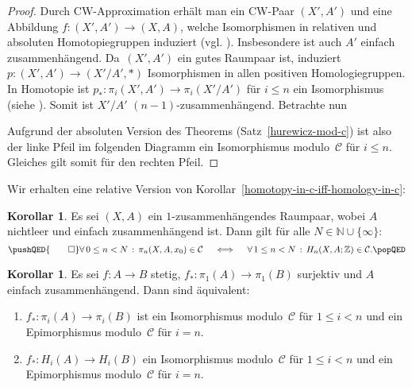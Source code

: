 \documentclass[11pt, a4paper, german]{article}
\theoremstyle{definition}
\newtheorem{kor}[lem]{Korollar}
\theoremstyle{remark}
\newcommand{\N}{\mathbb{N}} %
\newcommand{\Z}{\mathbb{Z}} %
\newcommand{\fa}[1]{\forall \, {#1} \,:\,}
\newcommand{\SC}{\mathcal{C}} %
\begin{document}
\begin{proof}
  Durch CW-Approximation erhält man ein CW-Paar $(X', A')$ und eine Abbildung $f : (X', A') \to (X, A)$, welche Isomorphismen in relativen und absoluten Homotopiegruppen induziert (vgl. \cite[\mbox{} Ex 4.14]{hatcher:at}).
  Insbesondere ist auch $A'$ einfach zusammenhängend.
  Da~$(X', A')$ ein gutes Raumpaar ist, induziert $p : (X', A') \to (X'/A', *)$ Isomorphismen in allen positiven Homologiegruppen.
  In Homotopie ist $p_* : \pi_i(X', A') \to \pi_i(X'/A')$ für $i \leq n$ ein Isomorphismus (siehe \cite[\mbox{} Prop 4.28]{hatcher:at}).
  Somit ist $X'/A'$ $(n {-} 1)$-zusammenhängend.
  Betrachte nun
  \begin{center}
  \end{center}
  Aufgrund der absoluten Version des Theorems (Satz~\ref{hurewicz-mod-c}) ist also der linke Pfeil im folgenden Diagramm ein Isomorphismus modulo~$\SC$ für $i \leq n$.
  Gleiches gilt somit für den rechten Pfeil.
\end{proof}

Wir erhalten eine relative Version von Korollar~\ref{homotopy-in-c-iff-homology-in-c}:

\begin{kor}\label{homotopy-in-c-iff-homology-in-c-relative}
  Es sei $(X, A)$ ein $1$-zusammenhängendes Raumpaar, wobei $A$ nichtleer und einfach zusammenhängend ist.
  Dann gilt für alle $N \in \N \cup \{ \infty \}$:
  \[
    \pushQED{\qed} 
    \fa{0 \leq n < N} \pi_n(X, A, x_0) \in \SC
    \quad \iff \quad
    \fa{1 \leq n < N} H_n(X, A; \Z) \in \SC.
    \qedhere
    \popQED
  \]
\end{kor}

\begin{kor}\label{homotopy-homology-equivalence-mod-c}
  Es sei $f : A \to B$ stetig, $f_* : \pi_1(A) \to \pi_1(B)$ surjektiv und $A$ einfach zusammenhängend.
  Dann sind äquivalent:
  \begin{enumerate}[label=(\alph*)]
    \item $f_* : \pi_i(A) \to \pi_i(B)$ ist ein Isomorphismus modulo~$\SC$ für $1 \leq i < n$ und ein Epimorphismus modulo~$\SC$ für $i = n$.
    \item $f_* : H_i(A) \to H_i(B)$ ein Isomorphismus modulo~$\SC$ für $1 \leq i < n$ und ein Epimorphismus modulo~$\SC$ für $i = n$.
  \end{enumerate}
\end{kor}
\end{document}

